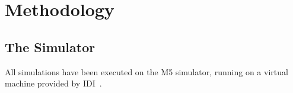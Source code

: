 \section{Methodology} %


\subsection{The Simulator}
All simulations have been executed on the M5 simulator, running on a
virtual machine provided by IDI~\cite{idi}.

